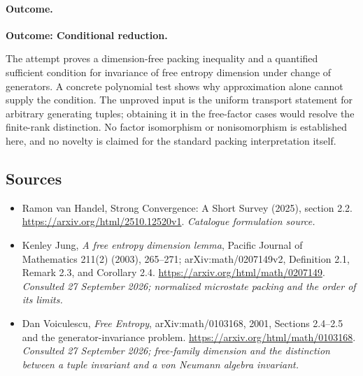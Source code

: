 \documentclass[11pt,a4paper]{article}
\numberwithin{equation}{section}
\begin{document}
\paragraph{Outcome.}
\textbf{Outcome: Conditional reduction.}

The attempt proves a dimension-free packing inequality and a quantified
sufficient condition for invariance of free entropy dimension under change
of generators. A concrete polynomial test shows why approximation alone
cannot supply the condition. The unproved input is the uniform transport
statement for arbitrary generating tuples; obtaining it in the free-factor
cases would resolve the finite-rank distinction. No factor isomorphism or
nonisomorphism is established here, and no novelty is claimed for the
standard packing interpretation itself.
\subsection{Sources}
\begin{itemize}\raggedright
\item[\textnormal{[S1]}]\hypertarget{source:30001752:1}{} Ramon van Handel, Strong Convergence: A Short Survey (2025), section 2.2.
\url{https://arxiv.org/html/2510.12520v1}.
{\small\textit{Catalogue formulation source.}}
\item[\textnormal{[E1]}]\hypertarget{extra:30001752:1}{} Kenley Jung,
\emph{A free entropy dimension lemma}, Pacific Journal of Mathematics
211(2) (2003), 265--271; arXiv:math/0207149v2,
Definition 2.1, Remark 2.3, and Corollary 2.4.
\url{https://arxiv.org/html/math/0207149}.
{\small\textit{Consulted 27 September 2026; normalized microstate packing
and the order of its limits.}}
\item[\textnormal{[E2]}]\hypertarget{extra:30001752:2}{} Dan Voiculescu,
\emph{Free Entropy}, arXiv:math/0103168, 2001,
Sections 2.4--2.5 and the generator-invariance problem.
\url{https://arxiv.org/html/math/0103168}.
{\small\textit{Consulted 27 September 2026; free-family dimension and the
distinction between a tuple invariant and a von Neumann algebra invariant.}}
\end{itemize}
\end{document}
